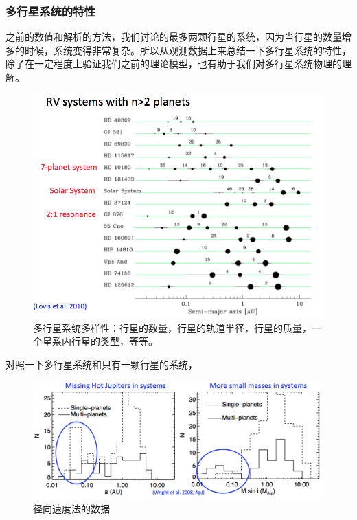 \documentclass[letterpaper,10pt,english]{sphinxmanual}
\begin{document}
\subsubsection{多行星系统的特性}
\label{statistics:id18}
之前的数值和解析的方法，我们讨论的最多两颗行星的系统，因为当行星的数量增多的时候，系统变得非常复杂。所以从观测数据上来总结一下多行星系统的特性，除了在一定程度上验证我们之前的理论模型，也有助于我们对多行星系统物理的理解。
\begin{figure}[htbp]
\centering
\capstart

\includegraphics{diversityOfMulti.png}
\caption{多行星系统多样性：行星的数量，行星的轨道半径，行星的质量，一个星系内行星的类型，等等。}\end{figure}

对照一下多行星系统和只有一颗行星的系统，
\begin{figure}[htbp]
\centering
\capstart

\includegraphics{seperationAndMassDifference.png}
\caption{径向速度法的数据}\end{figure}
\end{document}
